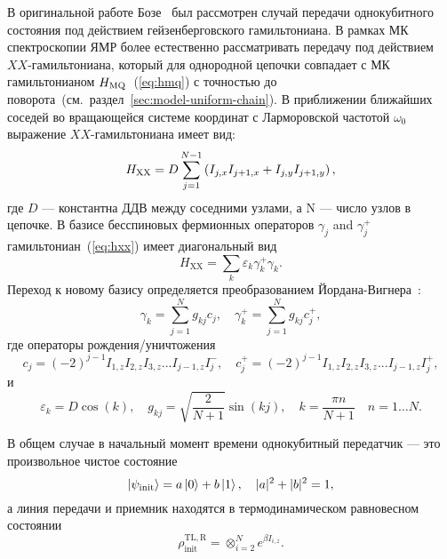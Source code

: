 В оригинальной работе Бозе~\cite{Bose2003} был рассмотрен случай передачи однокубитного состояния под действием гейзенберговского гамильтониана.
В рамках МК спектроскопии ЯМР более естественно рассматривать передачу под действием $XX$-гамильтониана,
который для однородной цепочки совпадает с МК гамильтонианом $H_\mathrm{MQ}$~(\ref{eq:hmq}) с точностью до поворота~(см.~раздел~\ref{sec:model-uniform-chain}).
В приближении ближайших соседей во вращающейся системе координат с Ларморовской частотой $\omega_0$ выражение $XX$-гамильтониана имеет вид:
%
\begin{equation}\label{eq:hxx}
  H_\mathrm{XX} = D\sum_{j=1}^{N-1}\left( I_{j,x}I_{j+1,x} + I_{j,y}I_{j+1,y} \right),
\end{equation}
где $D$ --- константна ДДВ между соседними узлами,
а N --- число узлов в цепочке.
В базисе бесспиновых фермионных операторов $\gamma_j$ and $\gamma_j ^+$
гамильтониан~(\ref{eq:hxx}) имеет диагональный вид
\begin{equation}\label{Diagonal_Hamiltonian}
  H_\mathrm{XX}=\sum\limits _{k}\varepsilon _{k}\gamma ^{+}_{k}\gamma _{k}.
\end{equation}
Переход к новому базису определяется преобразованием Йордана-Вигнера~\cite{Jordan1928, Feldman1998}:
\begin{equation}\label{eq:jw_operators}
  \gamma _{k}=\sum\limits ^{N}_{j=1}g_{kj} c_{j},
  \quad
  \gamma^+ _{k}=\sum\limits ^{N}_{j=1}g_{kj} c_{j}^+,
\end{equation}
где операторы рождения/уничтожения
\begin{equation}\label{eq:creation_annihilation_operators}
  c_{j}=(-2)^{j-1}I_{1,z}I_{2,z}I_{3,z}...I_{j-1,z}I^-_j,
  \quad
  c_{j}^+=(-2)^{j-1}I_{1,z}I_{2,z}I_{3,z}...I_{j-1,z}I^+_j,
\end{equation}
и
\begin{equation}\label{eq:gammakj}
  \varepsilon_{k} = D \cos(k),
  \quad
  g_{kj} =\sqrt {\frac {2}{N+1}}\sin \left( kj\right),
  \quad
  k=\frac {\pi n}{N+1}\quad n=1\ldots N .
\end{equation}

В общем случае в начальный момент времени однокубитный передатчик --- это произвольное чистое состояние
%
\begin{equation}\label{eq:random-pure-state}
  \left| \psi_\mathrm{init} \right\rangle = a\left| 0 \right\rangle + b\left| 1 \right\rangle,
  \quad
  |a|^2 + |b|^2 = 1,
\end{equation}
%
а линия передачи и приемник находятся в термодинамическом равновесном состоянии
%
\begin{equation}
    \rho^\mathrm{TL, R}_\mathrm{init} = \otimes_{i=2}^N e^{\beta I_{i, z}}.
\end{equation}

